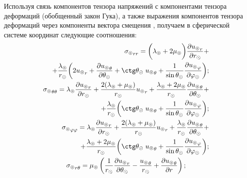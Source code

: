 Используя связь компонентов тензора напряжений с компонентами тензора деформаций (обобщенный закон Гука), а также выражения компонентов тензора деформаций через компоненты вектора смещения \cite{Nowacki}, получаем в сферической системе координат следующие соотношения:
\begin{equation}\label{tensor comp}
    \begin{gathered}
    \begin{aligned}
        {\sigma_\circledcirc}_{rr} = \biggl(\lambda_\circledcirc+2\mu_\circledcirc\biggr)\frac{\partial {u_\circledcirc}_r}{\partial r_\odot} +\\
        + \frac{\lambda_\circledcirc} {r_\odot} \biggl(2{u_\circledcirc}_r+\frac{\partial {u_\circledcirc}_\theta}{\partial\theta_\odot}+\ctg\theta_\odot\;{u_\circledcirc}_\theta + \frac{1}{\sin\theta_\odot}\frac{\partial {u_\circledcirc}_\varphi}{\partial\varphi_\odot}\biggr);\\        
        {\sigma_\circledcirc}_{\theta\theta} = \lambda_\circledcirc\frac{\partial {u_\circledcirc}_r}{\partial r_\odot} + \frac{2(\lambda_\circledcirc+\mu_\circledcirc)}{r_\odot} {u_\circledcirc}_r + \frac{\lambda_\circledcirc+2\mu_\circledcirc}{r_\odot} \frac{\partial {u_\circledcirc}_\theta}{\partial\theta_\odot} +\\
         + \frac{\lambda_\circledcirc}{r_\odot} \biggl(\ctg\theta_\odot \;{u_\circledcirc}_\theta + \frac{1}{\sin\theta_\odot}\frac{\partial {u_\circledcirc}_\varphi}{\partial\varphi_\odot}\biggr);\\
        {\sigma_\circledcirc}_{\varphi\varphi} = \lambda_\circledcirc\frac{\partial {u_\circledcirc}_r}{\partial r_\odot} + \frac{2(\lambda_\circledcirc+\mu_\circledcirc)}{r_\odot} {u_\circledcirc}_r + \frac{\lambda_\circledcirc}{r_\odot} \frac{\partial {u_\circledcirc}_\theta}{\partial\theta_\odot} +\\
        + \frac{\lambda_\circledcirc+2\mu_\circledcirc}{r_\odot}\biggl(\ctg\theta_\odot \;{u_\circledcirc}_\theta + \frac{1}{\sin\theta_\odot}\frac{\partial {u_\circledcirc}_\varphi}{\partial\varphi_\odot}\biggr);\\
    \end{aligned}\\
    \begin{aligned}
        {\sigma_\circledcirc}_{r\theta}=\mu_\circledcirc\left(\frac1{r_\odot} \frac{\partial {u_\circledcirc}_r}{\partial\theta_\odot} - \frac{{u_\circledcirc}_\theta}{r_\odot} + \frac{\partial {u_\circledcirc}_\theta}{\partial r}\right);\\

\end{aligned}
\end{gathered}
\end{equation}

